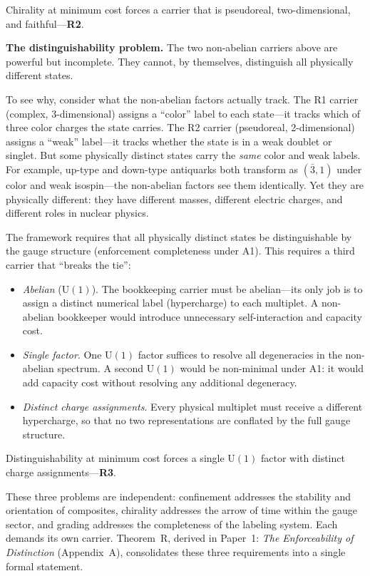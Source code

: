 \documentclass[11pt]{article}
\newenvironment{varlist}{\begin{itemize}[nosep,leftmargin=2em]}{\end{itemize}}
\newcommand{\U}{\mathrm{U}}
\begin{document}
\noindent Chirality at minimum cost forces a carrier that is pseudoreal, two-dimensional, and faithful---\textbf{R2}.

\medskip
\textbf{The distinguishability problem.}  The two non-abelian carriers above are powerful but incomplete.  They cannot, by themselves, distinguish all physically different states.

To see why, consider what the non-abelian factors actually track.  The R1 carrier (complex, 3-dimensional) assigns a ``color'' label to each state---it tracks which of three color charges the state carries.  The R2 carrier (pseudoreal, 2-dimensional) assigns a ``weak'' label---it tracks whether the state is in a weak doublet or singlet.  But some physically distinct states carry the \emph{same} color and weak labels.  For example, up-type and down-type antiquarks both transform as $(\bar{3}, 1)$ under color and weak isospin---the non-abelian factors see them identically.  Yet they are physically different: they have different masses, different electric charges, and different roles in nuclear physics.

The framework requires that all physically distinct states be distinguishable by the gauge structure (enforcement completeness under A1).  This requires a third carrier that ``breaks the tie'':

\begin{varlist}
\item \textit{Abelian} ($\U(1)$).  The bookkeeping carrier must be abelian---its only job is to assign a distinct numerical label (hypercharge) to each multiplet.  A non-abelian bookkeeper would introduce unnecessary self-interaction and capacity cost.
\item \textit{Single factor}.  One $\U(1)$ factor suffices to resolve all degeneracies in the non-abelian spectrum.  A second $\U(1)$ would be non-minimal under A1: it would add capacity cost without resolving any additional degeneracy.
\item \textit{Distinct charge assignments}.  Every physical multiplet must receive a different hypercharge, so that no two representations are conflated by the full gauge structure.
\end{varlist}

\noindent Distinguishability at minimum cost forces a single $\U(1)$ factor with distinct charge assignments---\textbf{R3}.

\medskip
These three problems are independent: confinement addresses the stability and orientation of composites, chirality addresses the arrow of time within the gauge sector, and grading addresses the completeness of the labeling system.  Each demands its own carrier.  Theorem~R, derived in Paper~1: \emph{The Enforceability of Distinction} (Appendix~A), consolidates these three requirements into a single formal statement.
\end{document}
